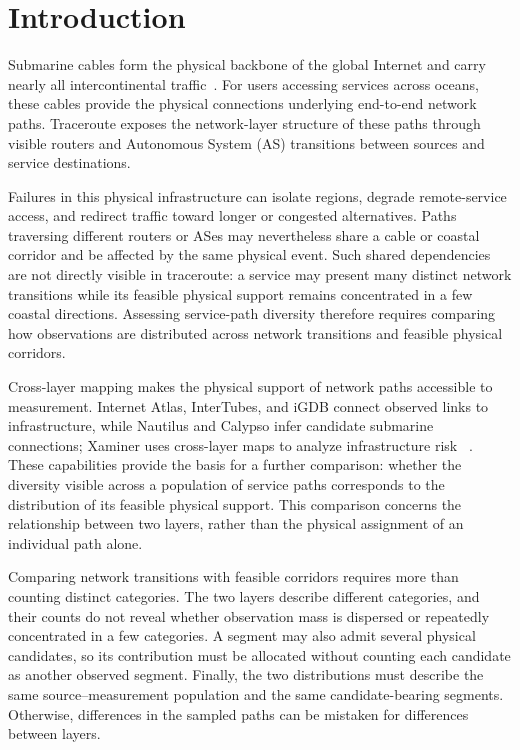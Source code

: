 \section{Introduction}
\label{sec:introduction}

Submarine cables form the physical backbone of the global Internet and carry
nearly all intercontinental traffic~\cite{telegeography_submarine_map}.
For users accessing services across oceans, these cables provide the physical
connections underlying end-to-end network paths. Traceroute exposes the
network-layer structure of these paths through visible routers and
Autonomous System (AS) transitions between sources and service destinations.

Failures in this physical infrastructure can isolate regions, degrade
remote-service access, and redirect traffic toward longer or congested
alternatives. Paths traversing different routers or ASes may nevertheless
share a cable or coastal corridor and be affected by the same physical event.
Such shared dependencies are not directly visible in traceroute: a service
may present many distinct network transitions while its feasible physical
support remains concentrated in a few coastal directions. Assessing
service-path diversity therefore requires comparing how observations are
distributed across network transitions and feasible physical corridors.

Cross-layer mapping makes the physical support of network paths accessible
to measurement. Internet Atlas, InterTubes, and iGDB connect observed links
to infrastructure, while Nautilus and Calypso infer candidate submarine
connections; Xaminer uses cross-layer maps to analyze infrastructure risk
~\cite{durairajan2013atlas,durairajan2015intertubes,anderson2022igdb,
ramanathan2023nautilus,wang2025calypso,ramanathan2024xaminer}.
These capabilities provide the basis for a further comparison: whether
the diversity visible across a population of service paths corresponds
to the distribution of its feasible physical support. This comparison
concerns the relationship between two layers, rather than the physical
assignment of an individual path alone.

Comparing network transitions with feasible corridors requires more than
counting distinct categories. The two layers describe different categories,
and their counts do not reveal whether observation mass is dispersed or
repeatedly concentrated in a few categories. A segment may also admit
several physical candidates, so its contribution must be allocated without
counting each candidate as another observed segment. Finally, the two
distributions must describe the same source--measurement population and
the same candidate-bearing segments. Otherwise, differences in the sampled
paths can be mistaken for differences between layers.

